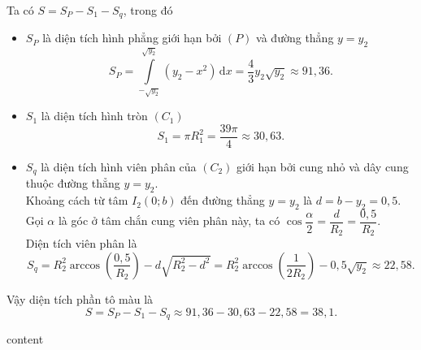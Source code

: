 \begin{ex}
{		Ta có $S = S_P - S_1 - S_q$, trong đó
		\begin{itemize}
			\item $S_P$ là diện tích hình phẳng giới hạn bởi $(P)$ và đường thẳng $y=y_2$
			\[S_P = \displaystyle\int\limits_{-\sqrt{y_2}}^{\sqrt{y_2}} \left(y_2 - x^2\right) \mathrm{\,d}x = \dfrac{4}{3}y_2\sqrt{y_2} \approx 91{,}36.\]
			\item $S_1$ là diện tích hình tròn $(C_1)$
			\[S_1 = \pi R_1^2 = \dfrac{39\pi}{4} \approx 30{,}63.\]
			\item $S_q$ là diện tích hình viên phân của $(C_2)$ giới hạn bởi cung nhỏ và dây cung thuộc đường thẳng $y=y_2$.\\
			Khoảng cách từ tâm $I_2(0;b)$ đến đường thẳng $y=y_2$ là $d = b - y_2 = 0{,}5$.\\
			Gọi $\alpha$ là góc ở tâm chắn cung viên phân này, ta có $\cos \dfrac{\alpha}{2} = \dfrac{d}{R_2} = \dfrac{0{,}5}{R_2}$. \\
			Diện tích viên phân là
			\[S_q = R_2^2 \arccos \left(\dfrac{0{,}5}{R_2}\right) - d\sqrt{R_2^2 - d^2} = R_2^2 \arccos \left(\dfrac{1}{2R_2}\right) - 0{,}5\sqrt{y_2} \approx 22{,}58.\]
		\end{itemize}
		Vậy diện tích phần tô màu là
		\[S = S_P - S_1 - S_q \approx 91{,}36 - 30{,}63 - 22{,}58 = 38{,}1.\]
	}
\end{ex}
\begin{ex}
	content
\end{ex}
